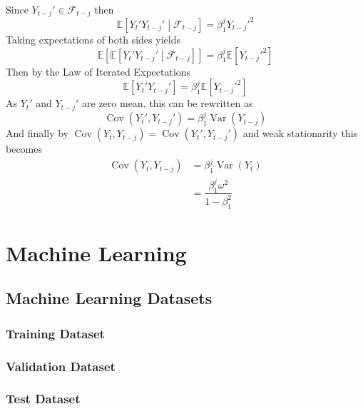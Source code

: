 \documentclass[11pt]{report} %
\begin{document}
Since $Y_{t - j}' \in \mathcal{F}_{t- j}$ then
\begin{equation}
\mathbb{E}\left[Y_{t}'Y_{t - j}'\middle|\mathcal{F}_{t-j}\right] = \beta_{1}^{j}Y_{t - j}'^{2}
\end{equation}
Taking expectations of both sides yields
\begin{equation}
\mathbb{E}\left[\mathbb{E}\left[Y_{t}'Y_{t - j}'\middle|\mathcal{F}_{t-j}\right]\right] = \beta_{1}^{j}\mathbb{E}\left[Y_{t - j}'^{2}\right]
\end{equation}
Then by the Law of Iterated Expectations
\begin{equation}
\mathbb{E}\left[Y_{t}'Y_{t - j}'\right] = \beta_{1}^{j}\mathbb{E}\left[Y_{t - j}'^{2}\right]
\end{equation}
As $Y_{t}'$ and $Y_{t - j}'$ are zero mean, this can be rewritten as
\begin{equation}
\operatorname{Cov}\left(Y_{t}', Y_{t - j}'\right) = \beta_{1}^{j}\operatorname{Var}\left(Y_{t - j}\right)
\end{equation}
And finally by $\operatorname{Cov}\left(Y_{t}, Y_{t - j}\right) = \operatorname{Cov}\left(Y_{t}', Y_{t - j}'\right)$ and weak stationarity this becomes
\begin{align}
\operatorname{Cov}\left(Y_{t}, Y_{t - j}\right) &= \beta_{1}^{j}\operatorname{Var}\left(Y_{t}\right) \\
&= \dfrac{\beta_{1}^{j}\omega^{2}}{1 - \beta_{1}^{2}}
\end{align}

\chapter{Machine Learning}

\section{Machine Learning Datasets}

\subsection{Training Dataset}

\subsection{Validation Dataset}

\subsection{Test Dataset}
\end{document}
